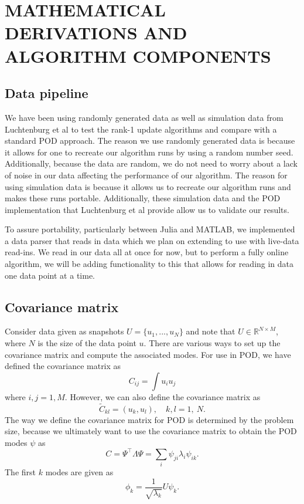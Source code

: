 \documentclass[onecolumn]{webofc}
\begin{document}
\section{MATHEMATICAL DERIVATIONS AND ALGORITHM COMPONENTS }
\subsection{Data pipeline}
We have been using randomly generated data as well as simulation data from Luchtenburg et al\cite{RefC} to test the rank-1 update algorithms and compare with a standard POD approach. The reason we use randomly generated data is because it allows for one to recreate our algorithm runs by using a random number seed. Additionally, because the data are random, we do not need to worry about a lack of noise in our data affecting the performance of our algorithm. The reason for using simulation data is because it allows us to recreate our algorithm runs and makes these runs portable. Additionally, these simulation data and the POD implementation that Luchtenburg et al provide allow us to validate our results.

To assure portability, particularly between Julia and MATLAB, we implemented a data parser that reads in data which we plan on extending to use with live-data read-ins. We read in our data all at once for now, but to perform a fully online algorithm, we will be adding functionality to this that allows for reading in data one data point at a time.


\subsection{Covariance matrix}
Consider data given as snapshots $U=\{u_1, ..., u_N\}$ and note that $U\in \mathbb R^{N\times M}$, where $N$ is the size of the data point $u$.
There are various ways to set up the covariance matrix and compute the associated modes. 
For use in POD\cite{RefC}, we have defined the covariance matrix as 
\begin{equation}
 C_{ij}= \int u_i u_j
 \end{equation} where $i, j = 1, M$. However, we can also define the covariance matrix as 
 \begin{equation}
 \widetilde{C}_{kl}= (u_k, u_l),\quad  k,l=1,\ N.
 \end{equation} The way we define the covariance matrix for POD is determined by the problem size, because we ultimately want to use the covariance matrix to obtain the POD modes $\psi$ as \begin{equation}
 C=\Psi^{\top}\Lambda\Psi=\sum_i\psi_{ji}\lambda_i\psi_{ik}. 
\end{equation}
The first $k$ modes are given as 
\begin{equation}
\phi_k=\frac{1}{\sqrt{\lambda_k}}U\psi_k. 
\end{equation}
\end{document}
